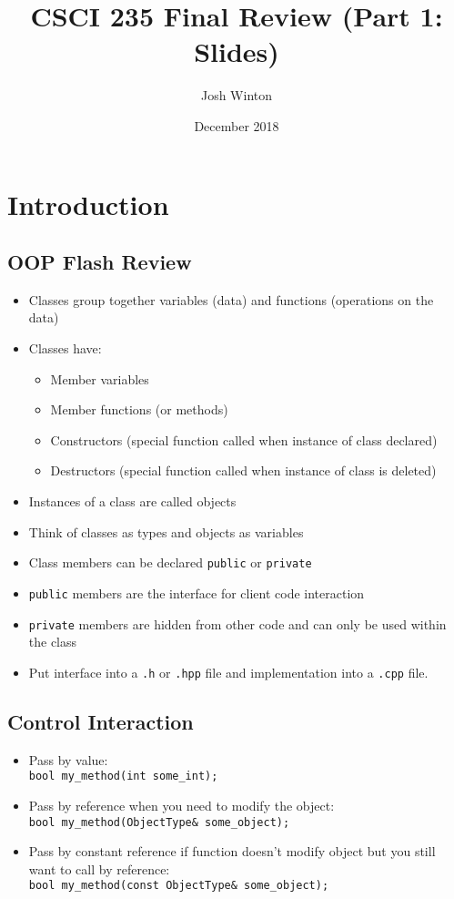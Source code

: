 \documentclass{article}
\title{CSCI 235 Final Review (Part 1: Slides)}
\author{Josh Winton}
\date{December 2018}
\begin{document}
\maketitle

\section{Introduction}
\subsection{OOP Flash Review}
\begin{itemize}
    \item Classes group together variables (data) and functions (operations on the data)
    \item Classes have:
    \begin{itemize}
        \item Member variables
        \item Member functions (or methods)
        \item Constructors (special function called when instance of class declared)
        \item Destructors (special function called when instance of class is deleted)
    \end{itemize}
    \item Instances of a class are called objects
    \item Think of classes as types and objects as variables
    \item Class members can be declared \verb|public| or \verb|private|
    \item \verb|public| members are the interface for client code interaction
    \item \verb|private| members are hidden from other code and can only be used within the class
    \item Put interface into a \verb|.h| or \verb|.hpp| file and implementation into a \verb|.cpp| file.
\end{itemize}

\subsection{Control Interaction}
\begin{itemize}
    \item Pass by value:\\ \verb|bool my_method(int some_int);|
    \item Pass by reference when you need to modify the object:\\ \verb|bool my_method(ObjectType& some_object);|
    \item Pass by constant reference if function doesn't modify object but you still want to call by reference:\\ \verb|bool my_method(const ObjectType& some_object);|
\end{itemize}
\end{document}
